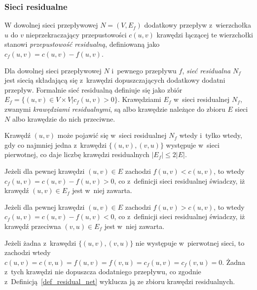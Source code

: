 \subsubsection{\textbf{Sieci residualne}}
\par{
  W dowolnej sieci przepływowej $N=(V, E_f)$ dodatkowy przepływ z~wierzchołka $u$ do $v$ nieprzekraczający przepustowości $c(u, v)$ krawędzi łączącej te wierzchołki stanowi \emph{przepustowość residualną}, definiowaną jako $c_f(u ,v) = c(u, v) - f(u, v)$.
  \begin{definition}
    Dla dowolnej sieci przepływowej $N$ i~pewnego przepływu $f$, \emph{sieć residualna} $N_f$ jest siecią składającą się z~krawędzi dopuszczających dodatkowy dodatni przepływ.
    Formalnie sieć residualną definiuje się jako zbiór $E_f=\{(u, v) \in V \times V | c_f(u,v) > 0\}$.
    Krawędziami $E_f$ w~sieci residualnej $N_f$, zwanymi \emph{krawędziami residualnymi}, są albo krawędzie należące do zbioru $E$ sieci $N$ albo krawędzie do nich przeciwne.
  \end{definition}
  \begin{theorem}
    Krawędź $(u, v)$ może pojawić się w~sieci residualnej $N_f$ wtedy i~tylko wtedy, gdy co najmniej jedna z~krawędzi $\{(u, v), (v, u)\}$ występuje w~sieci pierwotnej, co daje liczbę krawędzi residualnych $|E_f| \leq 2|E|$.
  \end{theorem}
  \begin{bproof}
    Jeżeli dla pewnej krawędzi $(u, v) \in E$ zachodzi $f(u, v) < c(u, v)$, to wtedy $c_f(u, v) = c(u, v) - f(u, v) > 0$, co z~definicji sieci residualnej świadczy, iż krawędź $(u, v) \in E_f$ jest w~niej zawarta.

    Jeżeli dla pewnej krawędzi $(u, v) \in E$ zachodzi $f(u, v) > c(u, v)$, to wtedy $c_f(u, v) = c(u, v) - f(u, v) < 0$, co z~definicji sieci residualnej świadczy, iż krawędź przeciwna $(v, u) \in E_f$  jest w~niej zawarta.

    Jeżeli żadna z~krawędzi $\{(u, v), (v, u)\}$ nie występuje w~pierwotnej sieci, to zachodzi wtedy $c(u, v) = c(v, u) = f(u, v) = f(v, u) = c_f(u, v) = c_f(v, u)=0$.
    Żadna z~tych krawędzi nie dopuszcza dodatniego przepływu, co zgodnie z~Definicją~\ref{def_residual_net} wyklucza ją ze zbioru krawędzi residualnych.
  \end{bproof}
}

